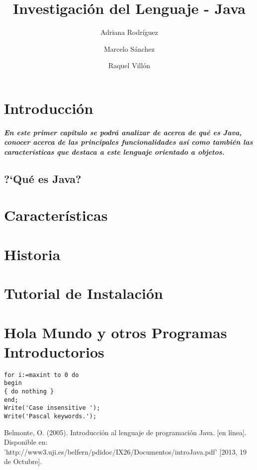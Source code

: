 \documentclass[12pt]{book} %
\title{Investigación del Lenguaje - Java}
\author{Adriana Rodríguez \and Marcelo Sánchez \and Raquel Villón}
\begin{document}
\maketitle

\tableofcontents
\newpage
\mbox{}

\chapter{Introducción}
\paragraph{En este primer capítulo se podrá analizar de acerca de qué es Java, conocer acerca de las principales funcionalidades así como también las características que destaca a este lenguaje orientado a objetos.}
\section{?`Qu\'e es Java?}
\chapter{Características}
\chapter{Historia}
\chapter{Tutorial de Instalación}
\chapter{Hola Mundo y otros Programas Introductorios}
\lstset{language=Pascal}          %
\begin{lstlisting}[frame=single]  % Start your code-block
for i:=maxint to 0 do
begin
{ do nothing }
end;
Write('Case insensitive ');
Write('Pascal keywords.');
\end{lstlisting}

\begin{thebibliography}{99}
 Belmonte, O. (2005). Introducción al lenguaje de programación Java. [en línea]. Disponible en: 'http://www3.uji.es/belfern/pdidoc/IX26/Documentos/introJava.pdf' [2013, 19 de Octubre].
\end{thebibliography}
\end{document}

